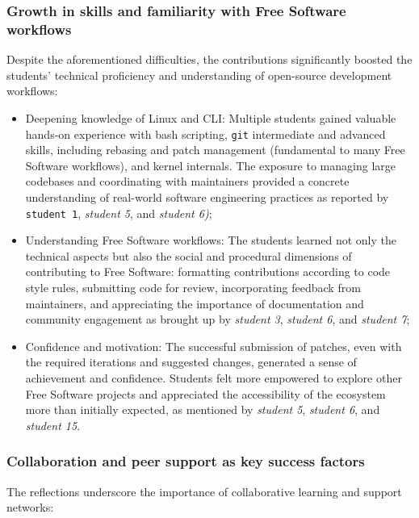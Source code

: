 \subsubsection{Growth in skills and familiarity with Free Software workflows}

Despite the aforementioned difficulties, the contributions significantly boosted
the students' technical proficiency and understanding of open-source development
workflows:

\begin{itemize}
    \item Deepening knowledge of Linux and CLI: Multiple students gained
    valuable hands-on experience with bash scripting, \texttt{git} intermediate
    and advanced skills, including rebasing and patch management (fundamental to
    many Free Software workflows), and kernel internals. The exposure to
    managing large codebases and coordinating with maintainers provided a
    concrete understanding of real-world software engineering practices as
    reported by \texttt{student 1}, \textit{student 5}, and \textit{student 6)};
    \item Understanding Free Software workflows: The students learned not only
    the technical aspects but also the social and procedural dimensions of
    contributing to Free Software: formatting contributions according to code
    style rules, submitting code for review, incorporating feedback from
    maintainers, and appreciating the importance of documentation and community
    engagement as brought up by \textit{student 3}, \textit{student 6}, and
    \textit{student 7};
    \item Confidence and motivation: The successful submission of patches, even
    with the required iterations and suggested changes, generated a sense of
    achievement and confidence. Students felt more empowered to explore other
    Free Software projects and appreciated the accessibility of the ecosystem
    more than initially expected, as mentioned by \textit{student 5},
    \textit{student 6}, and \textit{student 15}.
\end{itemize}

\subsubsection{Collaboration and peer support as key success factors}

The reflections underscore the importance of collaborative learning and support
networks:

